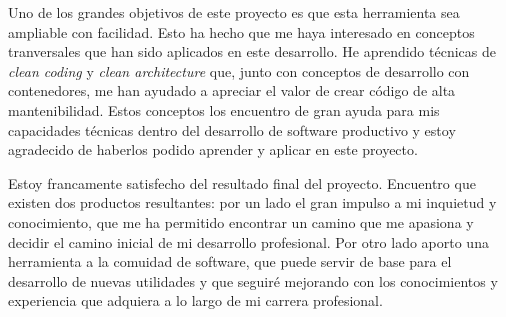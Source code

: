 Uno de los grandes objetivos de este proyecto es que esta herramienta sea ampliable 
con facilidad. Esto ha hecho que me haya interesado en conceptos tranversales que 
han sido aplicados en este desarrollo. He aprendido técnicas de \textit{clean coding} y 
\textit{clean architecture} que, junto con conceptos de desarrollo con contenedores, 
me han ayudado a apreciar el valor de crear código de alta mantenibilidad. Estos 
conceptos los encuentro de gran ayuda para mis capacidades técnicas dentro del 
desarrollo de software productivo y estoy agradecido de haberlos podido aprender y 
aplicar en este proyecto.

Estoy francamente satisfecho del resultado final del proyecto. Encuentro que existen 
dos productos resultantes: por un lado el gran impulso a mi inquietud y conocimiento, 
que me ha permitido encontrar un camino que me apasiona y decidir el camino inicial 
de mi desarrollo profesional. Por otro lado aporto una herramienta a la comuidad de 
software, que puede servir de base para el desarrollo de nuevas utilidades y que 
seguiré mejorando con los conocimientos y experiencia que adquiera a lo largo de mi 
carrera profesional.